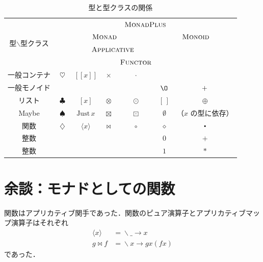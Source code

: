 \documentclass[a5paper,twoside,fleqn,draft]{jsbook}
\def\[{[\![}
\def\]{]\!]}
\newcommand{\mEmptyList}{{[\,]}}
\newcommand{\mNothing}{\emptyset}
\newcommand{\mZero}{\O}
\newcommand{\mAnonParam}{\diamond}
\DeclareMathOperator{\mAppend}{\oplus}
\DeclareMathOperator{\mAppMap}{\times}
\DeclareMathOperator{\mAppMapFunc}{\bowtie}
\DeclareMathOperator{\mAppMapList}{\otimes}
\DeclareMathOperator{\mAppMapMaybe}{\boxtimes}
\DeclareMathOperator{\mBind}{\heartsuit}
\DeclareMathOperator{\mBindFunc}{\diamondsuit}
\DeclareMathOperator{\mBindList}{\clubsuit}
\DeclareMathOperator{\mBindMaybe}{\spadesuit}
\DeclareMathOperator{\mComp}{\centerdot}
\DeclareMathOperator{\mLambda}{\backslash}
\DeclareMathOperator{\mLambdaArrow}{\rightarrow}
\DeclareMathOperator{\mMap}{\cdot}
\DeclareMathOperator{\mMapFunc}{\circ}
\DeclareMathOperator{\mMapList}{\odot}
\DeclareMathOperator{\mMapMaybe}{\boxdot}
\DeclareMathOperator{\mPlus}{\boldmath{+}} %
\newcommand{\mValueConstructor}[1]{\mathrm{#1}}
\newcommand{\mValueWith}[2]{\mValueConstructor{#1}\,#2}
\newcommand{\mJustWith}[1]{\mValueWith{Just}{#1}}
\newcommand{\mFuncWith}[1]{\langle#1\rangle}
\newcommand{\mPureWith}[1]{\[#1\]}
\newcommand{\mTypeClass}[1]{\textsc{#1}} %
\newcommand{\mApplicativeTypeClass}{\mTypeClass{Applicative}}
\newcommand{\mFunctorTypeClass}{\mTypeClass{Functor}}
\newcommand{\mMonadTypeClass}{\mTypeClass{Monad}}
\newcommand{\mMonadPlusTypeClass}{\mTypeClass{MonadPlus}}
\newcommand{\mMonoidTypeClass}{\mTypeClass{Monoid}}
\newcommand{\mLambdaEXP}[2]{\mLambda{#1}\mLambdaArrow{#2}} %
\begin{document}

\begin{table}
\label{tab:monadplus}
\caption{型と型クラスの関係}
\begin{center}
\begin{tabular}{||c||c|c|c|c|c|c||}
\hline
\multirow{4}{*}{型$\backslash$型クラス}
  &\multicolumn{6}{|c||}{$\mMonadPlusTypeClass$}\\
\cline{2-7}
\multirow{3}{*}{}
  &\multicolumn{4}{|c|}{$\mMonadTypeClass$}
  &\multicolumn{2}{|c||}{$\mMonoidTypeClass$}\\
\cline{3-5}
\multirow{2}{*}{}
  &
  &\multicolumn{3}{|c|}{$\mApplicativeTypeClass$}
  &\multicolumn{2}{|c||}{}\\
\cline{5-5}
\multirow{1}{*}{}
  &
  &\multicolumn{2}{|c|}{}
  &$\mFunctorTypeClass$
  &\multicolumn{2}{|c||}{}\\
\hline\hline
一般コンテナ
  &$\mBind$
  &$\mPureWith{x}$
  &$\mAppMap$
  &$\mMap$
  &
  &\\
\hline
一般モノイド
  &
  &
  &
  &
  &$\mZero$
  &$\mPlus$\\
\hline
リスト
  &$\mBindList$
  &$[x]$
  &$\mAppMapList$
  &$\mMapList$
  &$\mEmptyList$
  &$\mAppend$\\
\hline
Maybe
  &$\mBindMaybe$
  &$\mJustWith{x}$
  &$\mAppMapMaybe$
  &$\mMapMaybe$
  &$\mNothing$
  &（$x$ の型に依存）\\
\hline
関数
  &$\mBindFunc$
  &$\mFuncWith{x}$
  &$\mAppMapFunc$
  &$\mMapFunc$
  &$\mAnonParam$
  &$\mComp$\\
\hline
整数
  &
  &
  &
  &
  &$0$
  &$+$\\
\hline
整数
  &
  &
  &
  &
  &$1$
  &$*$\\
\hline
\end{tabular}
\end{center}
\end{table}

\section{余談：モナドとしての関数}

関数はアプリカティブ関手であった．関数のピュア演算子とアプリカティブマッ
プ演算子はそれぞれ
\begin{align}
\mFuncWith{x}&=\mLambdaEXP{\_}{x}\\
g\mAppMapFunc f&=\mLambdaEXP{x}{gx(fx)}
\end{align}
であった．
\end{document}
